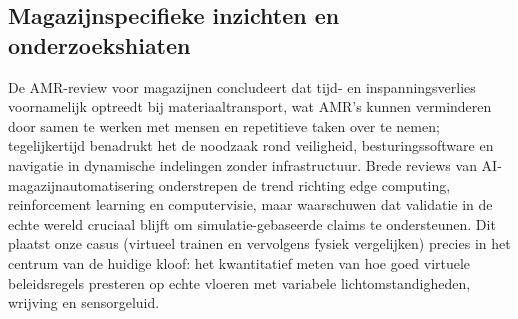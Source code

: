 \subsection{Magazijnspecifieke inzichten en onderzoekshiaten}
De AMR-review voor magazijnen concludeert dat tijd- en inspanningsverlies voornamelijk optreedt bij materiaaltransport, wat AMR’s kunnen verminderen door samen te werken met mensen en repetitieve taken over te nemen; tegelijkertijd benadrukt het de noodzaak rond veiligheid, besturingssoftware en navigatie in dynamische indelingen zonder infrastructuur. Brede reviews van AI-magazijnautomatisering onderstrepen de trend richting edge computing, reinforcement learning en computervisie, maar waarschuwen dat validatie in de echte wereld cruciaal blijft om simulatie-gebaseerde claims te ondersteunen. Dit plaatst onze casus (virtueel trainen en vervolgens fysiek vergelijken) precies in het centrum van de huidige kloof: het kwantitatief meten van hoe goed virtuele beleidsregels presteren op echte vloeren met variabele lichtomstandigheden, wrijving en sensorgeluid.
\autocite{Sodiya2024,Keith2024}



